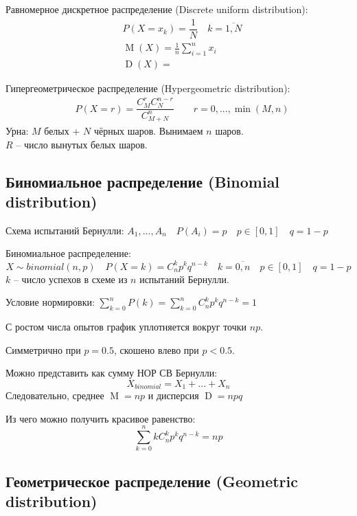 \documentclass[a4paper,12pt,fleqn]{article}
\newenvironment{onsamepage} {\begin{minipage}{\textwidth}} {\end{minipage}}
\numberwithin{figure}{section}
\theoremstyle{definition}
\let\DS\displaystyle
\DeclareMathOperator{\M}{M}
\DeclareMathOperator{\D}{D}
\begin{document}
\medskip
Равномерное дискретное распределение (Discrete uniform distribution):
\begin{align*}
&	P(X=x_k)=\dfrac{1}{N} \quad k=\overline{1,N} \\
&	\M(X) = \frac{1}{n} \sum_{i=1}^n x_i \\
&	\D(X) = 
\end{align*}

\medskip
\begin{onsamepage}
Гипергеометрическое распределение (Hypergeometric distribution):
\begin{align*}
&	P(X=r) = \dfrac{C_M^r C_N^{n-r}}{C_{M+N}^n} \qquad r = 0,...,\min(M,n)
\end{align*}
Урна: $M$ белых + $N$ чёрных шаров. Вынимаем $n$ шаров. \\
	  $R$ -- число вынутых белых шаров.
\end{onsamepage}


\subsection{Биномиальное распределение (Binomial distribution)}

Схема испытаний Бернулли:
$A_1,...,A_n \quad P(A_i)=p \quad p\in[0,1] \quad q=1-p$

Биномиальное распределение:
\[ X \sim binomial(n,p) \quad P(X=k)=C_n^k p^k q^{n-k}
   \quad k=\overline{0,n} \quad p\in[0,1] \quad q=1-p \]
$k$ -- число успехов в схеме из $n$ испытаний Бернулли.

Условие нормировки: $\DS \sum_{k=0}^n{P(k)} = \sum_{k=0}^n{C_n^k p^k q^{n-k}} = 1$

С ростом числа опытов график уплотняется вокруг точки $np$.

Симметрично при $p=0.5$, скошено влево при $p<0.5$.

Можно представить как сумму НОР СВ Бернулли:
\[ X_{binomial} = X_1 + ... + X_n \]
Следовательно, среднее $\M = np$ и дисперсия $\D = npq$

Из чего можно получить красивое равенство:
\[ \sum_{k=0}^n k C_n^k p^k q^{n-k} = np \]


\subsection{Геометрическое распределение (Geometric distribution)}
\end{document}
